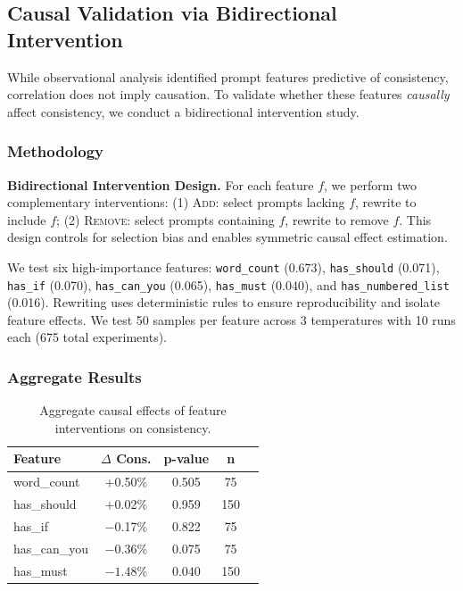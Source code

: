 \subsection{Causal Validation via Bidirectional Intervention}
\label{sec:causal_validation}

While observational analysis identified prompt features predictive of consistency, correlation does not imply causation. To validate whether these features \textit{causally} affect consistency, we conduct a bidirectional intervention study.

\subsubsection{Methodology}

\textbf{Bidirectional Intervention Design.} For each feature $f$, we perform two complementary interventions: (1) \textsc{Add}: select prompts lacking $f$, rewrite to include $f$; (2) \textsc{Remove}: select prompts containing $f$, rewrite to remove $f$. This design controls for selection bias and enables symmetric causal effect estimation.

We test six high-importance features: \texttt{word\_count} (0.673), \texttt{has\_should} (0.071), \texttt{has\_if} (0.070), \texttt{has\_can\_you} (0.065), \texttt{has\_must} (0.040), and \texttt{has\_numbered\_list} (0.016). Rewriting uses deterministic rules to ensure reproducibility and isolate feature effects. We test 50 samples per feature across 3 temperatures with 10 runs each (675 total experiments).

\subsubsection{Aggregate Results}

\begin{table}[h]
\centering
\caption{Aggregate causal effects of feature interventions on consistency.}
\label{tab:causal_aggregate}
\begin{tabular}{lcccc}
\toprule
Feature & $\Delta$ Cons. & p-value & n \\
\midrule
word\_count & +0.50\% & 0.505 & 75 \\
has\_should & +0.02\% & 0.959 & 150 \\
has\_if & $-$0.17\% & 0.822 & 75 \\
has\_can\_you & $-$0.36\% & 0.075 & 75 \\
has\_must & $\mathbf{-1.48\%}$ & $\mathbf{0.040}$ & 150 \\
\bottomrule
\end{tabular}
\end{table}

